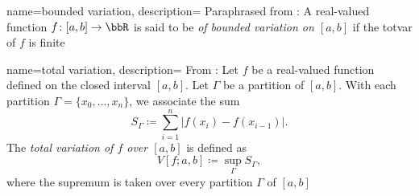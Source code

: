 
%
{%
  name={bounded variation},%
  description={%
    Paraphrased from \cite[Ch.\@ 2\S1, p.\@ 17]{wheeden-zygmund}: A
    real-valued function $f\colon[a,b]\to\bbR$ is said to be \emph{of
      bounded variation on $[a,b]$} if the \gls{totvar} of $f$ is
    finite%
  }%
}%

%
{%
  name={total variation},%
  description={%
    From \cite[Ch.\@ 2\S1, p.\@ 17]{wheeden-zygmund}: Let $f$ be a
    real-valued function defined on the closed interval $[a,b]$. Let
    $\Gamma$ be a partition of $[a,b]$. With each partition
    $\Gamma=\{x_0,\dotsc,x_n\}$, we associate the sum
    \[
      S_\Gamma\coloneqq\sum_{i=1}^n|f(x_i)-f(x_{i-1})|.
    \]
    The \emph{total variation of $f$ over $[a,b]$} is defined as
    \[
      V[f;a,b]\coloneqq\sup_{\Gamma}S_\Gamma,
    \]
    where the supremum is taken over every partition $\Gamma$ of $[a,b]$%
  }%
}%

